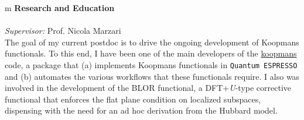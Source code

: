 \documentclass[10pt,a4paper,final]{article}
\begin{document}
\begin{tabularx}{\textwidth}{
   m{\dimexpr{}\tabcolsep}}
   \large\textbf{\textcolor{seaborn_bg_grey_half}{Research and Education}} \\
   \hbox{%
   } \\
   \textit{Supervisor:} Prof. Nicola Marzari
   \\
   The goal of my current postdoc is to drive the ongoing development of Koopmans functionals. To this end, I have been one of the main developers of the \href{https://koopmans-functionals.org/}{koopmans} code, a package that (a) implements Koopmans functionals in \texttt{Quantum ESPRESSO} and (b) automates the various workflows that these functionals require. I also was involved in the development of the BLOR functional, a DFT+\emph{U}-type corrective functional that enforces the flat plane condition on localized subspaces, dispensing with the need for an ad hoc derivation from the Hubbard model.
   \\

\end{tabularx}
\end{document}

